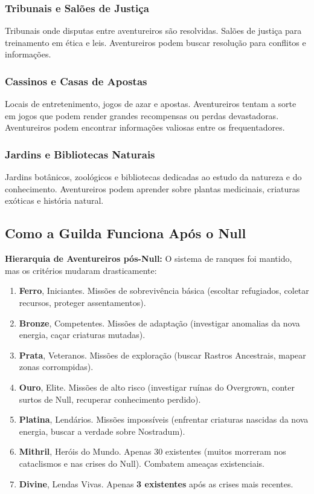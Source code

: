 \subsubsection*{Tribunais e Salões de Justiça}
Tribunais onde disputas entre aventureiros são resolvidas. Salões de justiça para treinamento em ética e leis. Aventureiros podem buscar resolução para conflitos e informações.

\subsubsection*{Cassinos e Casas de Apostas}
Locais de entretenimento, jogos de azar e apostas. Aventureiros tentam a sorte em jogos que podem render grandes recompensas ou perdas devastadoras. Aventureiros podem encontrar informações valiosas entre os frequentadores.

\subsubsection*{Jardins e Bibliotecas Naturais}
Jardins botânicos, zoológicos e bibliotecas dedicadas ao estudo da natureza e do conhecimento. Aventureiros podem aprender sobre plantas medicinais, criaturas exóticas e história natural.

\subsection*{Como a Guilda Funciona Após o Null}

\textbf{\ringmfamily Hierarquia de Aventureiros pós-Null:}
O sistema de ranques foi mantido, mas os critérios mudaram drasticamente:
\begin{enumerate}
    \item \textbf{Ferro}, Iniciantes. Missões de sobrevivência básica (escoltar refugiados, coletar recursos, proteger assentamentos).
    \item \textbf{Bronze}, Competentes. Missões de adaptação (investigar anomalias da nova energia, caçar criaturas mutadas).
    \item \textbf{Prata}, Veteranos. Missões de exploração (buscar Rastros Ancestrais, mapear zonas corrompidas).
    \item \textbf{Ouro}, Elite. Missões de alto risco (investigar ruínas do Overgrown, conter surtos de Null, recuperar conhecimento perdido).
    \item \textbf{Platina}, Lendários. Missões impossíveis (enfrentar criaturas nascidas da nova energia, buscar a verdade sobre Nostradum).
    \item \textbf{Mithril}, Heróis do Mundo. Apenas 30 existentes (muitos morreram nos cataclismos e nas crises do Null). Combatem ameaças existenciais.
    \item \textbf{Divine}, Lendas Vivas. Apenas \textbf{3 existentes} após as crises mais recentes.
\end{enumerate}

